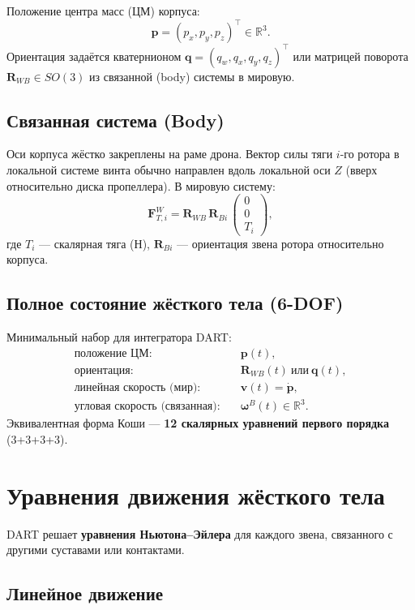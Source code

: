 \documentclass[a4paper,11pt]{article}
\newcommand{\R}{\mathbb{R}}
\newcommand{\vect}[1]{\bm{#1}}
\newcommand{\mat}[1]{\bm{#1}}
\begin{document}
Положение центра масс (ЦМ) корпуса:
\[
  \vect{p} = (p_x, p_y, p_z)^\top \in \R^3.
\]
Ориентация задаётся кватернионом $\vect{q} = (q_w, q_x, q_y, q_z)^\top$
или матрицей поворота $\mat{R}_{WB} \in SO(3)$ из связанной (body) системы
в мировую.

\subsection{Связанная система (Body)}

Оси корпуса жёстко закреплены на раме дрона. Вектор силы тяги $i$-го
ротора в локальной системе винта обычно направлен вдоль локальной оси $Z$
(вверх относительно диска пропеллера). В мировую систему:
\[
  \vect{F}_{T,i}^W = \mat{R}_{WB}\,\mat{R}_{B i}\,
  \begin{pmatrix} 0 \\ 0 \\ T_i \end{pmatrix},
\]
где $T_i$ --- скалярная тяга (Н), $\mat{R}_{B i}$ --- ориентация
звена ротора относительно корпуса.

\subsection{Полное состояние жёсткого тела (6-DOF)}

Минимальный набор для интегратора DART:
\begin{align*}
  \text{положение ЦМ:} &\quad \vect{p}(t), \\
  \text{ориентация:} &\quad \mat{R}_{WB}(t)\ \text{или}\ \vect{q}(t), \\
  \text{линейная скорость (мир):} &\quad \vect{v}(t) = \dot{\vect{p}}, \\
  \text{угловая скорость (связанная):} &\quad \vect{\omega}^B(t) \in \R^3.
\end{align*}
Эквивалентная форма Коши --- \textbf{12 скалярных уравнений первого порядка}
(3+3+3+3).

\section{Уравнения движения жёсткого тела}

DART решает \textbf{уравнения Ньютона--Эйлера} для каждого звена,
связанного с другими суставами или контактами.

\subsection{Линейное движение}
\end{document}
